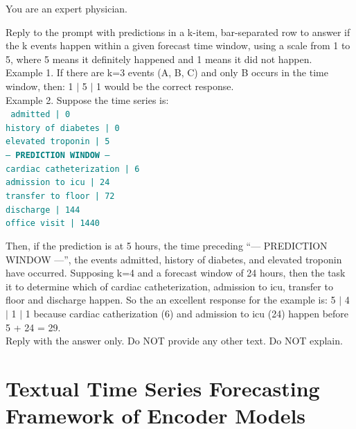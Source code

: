 \begin{tcolorbox}[colback=gray!5, colframe=gray!100, title=Prompt, boxrule=2pt]

{You are an expert physician.}

{Reply to the prompt with predictions in a k-item, bar-separated row to answer if the k events happen within a given forecast time window, using a scale from 1 to 5, where 5 means it definitely happened and 1 means it did not happen.}\\

{Example 1. If there are k=3 events (A, B, C) and only B occurs in the time window, then:
1 $\mid$ 5 $\mid$ 1
would be the correct response.}\\

{Example 2. Suppose the time series is:}\\
\noindent \texttt{\textcolor{teal}{
admitted | 0\\
history of diabetes | 0\\
elevated troponin | 5\\
--- \textbf{PREDICTION WINDOW} ---\\
cardiac catheterization | 6\\
admission to icu | 24\\
transfer to floor | 72\\
discharge | 144\\
office visit | 1440}}

{Then, if the prediction is at 5 hours, the time preceding ``--- PREDICTION WINDOW ---'', the events admitted, history of diabetes, and elevated troponin have occurred.  Supposing k=4 and a forecast window of 24 hours, then the task it to determine which of cardiac catheterization, admission to icu, transfer to floor and discharge happen. So the an excellent response for the example is:
5 $\mid$ 4 $\mid$ 1 $\mid$ 1
because cardiac catherization (6) and admission to icu (24) happen before 5 + 24 = 29.}\\

{Reply with the answer only. Do NOT provide any other text. Do NOT explain.}

\end{tcolorbox}

\twocolumn


\clearpage
\section{Textual Time Series Forecasting Framework of Encoder Models}
\label{apd:encoder-forecasting}


